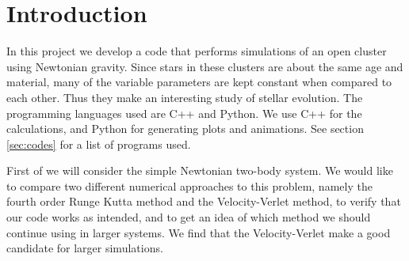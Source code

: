 \documentclass{aa}   %
\begin{document}
  




\section{Introduction}     \label{sec:introduction}
In this project we develop a code that performs simulations of an open cluster using Newtonian gravity. Since stars in these clusters are about the same age and material, many of the variable parameters are kept constant when compared to each other. Thus they make an interesting study of stellar evolution.
The programming languages used are C++ and Python. We use C++ for the calculations, and Python for generating plots and animations.
See section \ref{sec:codes} for a list of programs used.

First of we will consider the simple Newtonian two-body system. We would like to compare two different numerical approaches to this problem, namely the fourth order Runge Kutta method and the Velocity-Verlet method, to verify that our code works as intended, and to get an idea of which method we should  continue using in larger systems. We find that the Velocity-Verlet make a good candidate for larger simulations.
\end{document}
